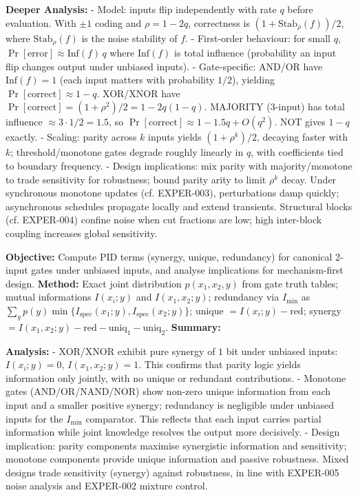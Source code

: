 \textbf{Deeper Analysis:}
- Model: inputs flip independently with rate $q$ before evaluation. With $\pm 1$ coding and $\rho = 1-2q$, correctness is $(1+\mathrm{Stab}_\rho(f))/2$, where $\mathrm{Stab}_\rho(f)$ is the noise stability of $f$.
- First-order behaviour: for small $q$, $\Pr[\text{error}] \approx \mathrm{Inf}(f)\,q$ where $\mathrm{Inf}(f)$ is total influence (probability an input flip changes output under unbiased inputs).
- Gate-specific: AND/OR have $\mathrm{Inf}(f)=1$ (each input matters with probability $1/2$), yielding $\Pr[\text{correct}]\approx 1-q$. XOR/XNOR have $\Pr[\text{correct}] = (1+\rho^2)/2 = 1-2q(1-q)$. MAJORITY (3-input) has total influence $\approx 3\cdot 1/2 = 1.5$, so $\Pr[\text{correct}]\approx 1-1.5q + O(q^2)$. NOT gives $1-q$ exactly.
- Scaling: parity across $k$ inputs yields $(1+\rho^k)/2$, decaying faster with $k$; threshold/monotone gates degrade roughly linearly in $q$, with coefficients tied to boundary frequency.
- Design implications: mix parity with majority/monotone to trade sensitivity for robustness; bound parity arity to limit $\rho^k$ decay. Under synchronous monotone updates (cf. EXPER-003), perturbations damp quickly; asynchronous schedules propagate locally and extend transients. Structural blocks (cf. EXPER-004) confine noise when cut fractions are low; high inter-block coupling increases global sensitivity.

\textbf{Objective:} Compute PID terms (synergy, unique, redundancy) for canonical 2-input gates under unbiased inputs, and analyse implications for mechanism-first design.
\textbf{Method:} Exact joint distribution $p(x_1,x_2,y)$ from gate truth tables; mutual informations $I(x_i;y)$ and $I(x_1,x_2;y)$; redundancy via $I_{\min}$ as $\sum_y p(y)\min\{I_{\mathrm{spec}}(x_1;y),I_{\mathrm{spec}}(x_2;y)\}$; unique $= I(x_i;y)-\mathrm{red}$; synergy $= I(x_1,x_2;y)-\mathrm{red}-\mathrm{uniq}_1-\mathrm{uniq}_2$.
\textbf{Summary:}
\begin{center}
\end{center}
\textbf{Analysis:}
- XOR/XNOR exhibit pure synergy of $1$ bit under unbiased inputs: $I(x_i;y)=0$, $I(x_1,x_2;y)=1$. This confirms that parity logic yields information only jointly, with no unique or redundant contributions.
- Monotone gates (AND/OR/NAND/NOR) show non-zero unique information from each input and a smaller positive synergy; redundancy is negligible under unbiased inputs for the $I_{\min}$ comparator. This reflects that each input carries partial information while joint knowledge resolves the output more decisively.
- Design implication: parity components maximise synergistic information and sensitivity; monotone components provide unique information and passive robustness. Mixed designs trade sensitivity (synergy) against robustness, in line with EXPER-005 noise analysis and EXPER-002 mixture control.



